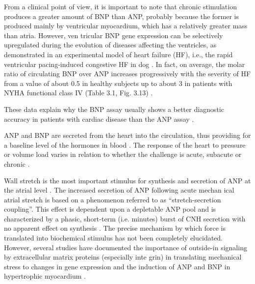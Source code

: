 \documentclass[14pt,a4paper,onecolumn]{extarticle}
\begin{document}
From a clinical point of view, it is important to note that chronic stimulation produces a greater amount of BNP than ANP, probably because the former is produced mainly by ventricular myocardium, which has a relatively greater mass than atria. However, ven tricular BNP gene expression can be selectively upregulated during the evolution of diseases affecting the ventricles, as demonstrated in an experimental model of heart failure (HF), i.e., the rapid ventricular pacing-induced congestive HF in dog \citep{27}. In fact, on average, the molar ratio of circulating BNP over ANP increases progressively with the severity of HF from a value of about 0.5 in healthy subjects up to about 3 in patients with NYHA functional class IV (Table 3.1, Fig. 3.13) \citep{28}.

These data explain why the BNP assay usually shows a better diagnostic accuracy in patients with cardiac disease than the ANP assay \citep{28}.

ANP and BNP are secreted from the heart into the circulation, thus providing for a baseline level of the hormones in blood \citep{13}. The response of the heart to pressure or volume load varies in relation to whether the challenge is acute, subacute or chronic \citep{12} \citep{13}.

Wall stretch is the most important stimulus for synthesis and secretion of ANP at the atrial level \citep{12} \citep{13} \citep{21} \citep{22} \citep{23}. The increased secretion of ANP following acute mechan ical atrial stretch is based on a phenomenon referred to as “stretch-secretion coupling”.  This effect is dependent upon a depletable ANP pool and is characterized by a phasic, short-term (i.e. minutes) burst of CNH secretion with no apparent effect on synthesis \citep{13}. The precise mechanism by which force is translated into biochemical stimulus has not been completely elucidated. However, several studies have documented the importance of outside-in signaling by extracellular matrix proteins (especially inte grin) in translating mechanical stress to changes in gene expression and the induction of ANP and BNP in hypertrophic myocardium \citep{22}.
\end{document}
